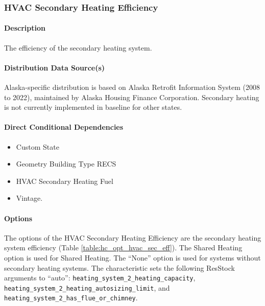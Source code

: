 \subsubsection{HVAC Secondary Heating Efficiency}
\paragraph{Description}
The efficiency of the secondary heating system.

\paragraph{Distribution Data Source(s)}
Alaska-specific distribution is based on Alaska Retrofit Information System (2008 to 2022), maintained by Alaska Housing Finance Corporation. Secondary heating is not currently implemented in baseline for other states.

\paragraph{Direct Conditional Dependencies}
\begin{itemize}
    \item Custom State
    \item Geometry Building Type RECS
    \item HVAC Secondary Heating Fuel
    \item Vintage.
\end{itemize}

\paragraph{Options}
The options of the HVAC Secondary Heating Efficiency are the secondary heating system efficiency (Table \ref{table:hc_opt_hvac_sec_eff}). The Shared Heating option is used for Shared Heating. The ``None'' option is used for systems without secondary heating systems. The characteristic sets the following ResStock arguments to ``auto'': \texttt{heating\_system\_2\_heating\_capacity}, \texttt{heating\_system\_2\_heating\_autosizing\_limit}, and \texttt{heating\_system\_2\_has\_flue\_or\_chimney}.

